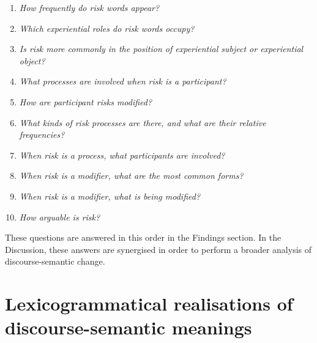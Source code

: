 				\begin{enumerate}\setlength\itemsep{-0.5em}
					\item \emph{How frequently do risk words appear?}
					\item \emph{Which experiential roles do risk words occupy?}
					\item \emph{Is risk more commonly in the position of experiential subject or experiential object?}
					\item \emph{What processes are involved when risk is a participant?}
					\item \emph{How are participant risks modified?}
					\item \emph{What kinds of risk processes are there, and what are their relative frequencies?}
					\item \emph{When risk is a process, what participants are involved?}
					\item \emph{When risk is a modifier, what are the most common forms?}
					\item \emph{When risk is a modifier, what is being modified?}
					\item \emph{How arguable is risk?} \label{lst:num}
				\end{enumerate}
				These questions are answered in this order in the Findings section. In the Discussion, these answers are synergised in order to perform a broader analysis of discourse-semantic change.

		\section{Lexicogrammatical realisations of discourse-semantic meanings}

